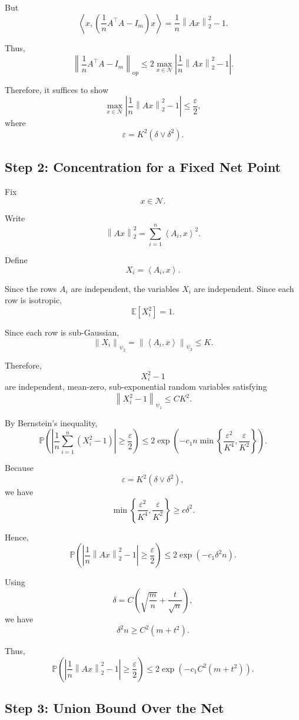 \documentclass[12pt,oneside]{book}
\numberwithin{equation}{section}
\theoremstyle{definition}
\theoremstyle{plain}
\theoremstyle{remark}
\newcommand{\E}{\mathbb{E}}
\newcommand{\Prob}{\mathbb{P}}
\newcommand{\norm}[1]{\left\lVert #1 \right\rVert}
\newcommand{\inner}[2]{\left\langle #1, #2 \right\rangle}
\begin{document}
But
\[
\inner{x}{
\left(
\frac{1}{n}A^\top A-I_m
\right)x}
=
\frac{1}{n}\norm{Ax}_2^2-1.
\]

Thus,
\[
\norm{\frac{1}{n}A^\top A-I_m}_{\mathrm{op}}
\leq
2
\max_{x\in\mathcal{N}}
\left|
\frac{1}{n}\norm{Ax}_2^2-1
\right|.
\]

Therefore, it suffices to show
\[
\max_{x\in\mathcal{N}}
\left|
\frac{1}{n}\norm{Ax}_2^2-1
\right|
\leq
\frac{\varepsilon}{2},
\]
where
\[
\varepsilon=K^2(\delta\vee\delta^2).
\]

\subsection{Step 2: Concentration for a Fixed Net Point}

Fix
\[
x\in\mathcal{N}.
\]

Write
\[
\norm{Ax}_2^2
=
\sum_{i=1}^n \inner{A_i}{x}^2.
\]

Define
\[
X_i=\inner{A_i}{x}.
\]

Since the rows $A_i$ are independent, the variables $X_i$ are independent. Since each row is isotropic,
\[
\E[X_i^2]=1.
\]

Since each row is sub-Gaussian,
\[
\norm{X_i}_{\psi_2}
=
\norm{\inner{A_i}{x}}_{\psi_2}
\leq
K.
\]

Therefore,
\[
X_i^2-1
\]
are independent, mean-zero, sub-exponential random variables satisfying
\[
\norm{X_i^2-1}_{\psi_1}
\leq
CK^2.
\]

By Bernstein's inequality,
\[
\Prob\left(
\left|
\frac{1}{n}\sum_{i=1}^n (X_i^2-1)
\right|
\geq
\frac{\varepsilon}{2}
\right)
\leq
2\exp\left(
-c_1n
\min\left\{
\frac{\varepsilon^2}{K^4},
\frac{\varepsilon}{K^2}
\right\}
\right).
\]

Because
\[
\varepsilon
=
K^2(\delta\vee\delta^2),
\]
we have
\[
\min\left\{
\frac{\varepsilon^2}{K^4},
\frac{\varepsilon}{K^2}
\right\}
\geq
c\delta^2.
\]

Hence,
\[
\Prob\left(
\left|
\frac{1}{n}\norm{Ax}_2^2-1
\right|
\geq
\frac{\varepsilon}{2}
\right)
\leq
2\exp(-c_1\delta^2 n).
\]

Using
\[
\delta
=
C\left(
\sqrt{\frac{m}{n}}+\frac{t}{\sqrt{n}}
\right),
\]
we have
\[
\delta^2 n
\geq
C^2(m+t^2).
\]

Thus,
\[
\Prob\left(
\left|
\frac{1}{n}\norm{Ax}_2^2-1
\right|
\geq
\frac{\varepsilon}{2}
\right)
\leq
2\exp(-c_1C^2(m+t^2)).
\]

\subsection{Step 3: Union Bound Over the Net}
\end{document}
